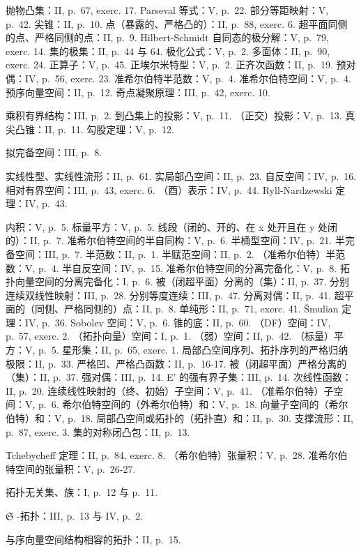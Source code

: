 抛物凸集：II, p.~67, exerc. 17. Parseval 等式：V, p.~22. 部分等距映射：V, p.~42. 尖锥：II, p.~10. 点（暴露的、严格凸的）：II, p.~88, exerc. 6. 超平面同侧的点、严格同侧的点：II, p.~9. Hilbert-Schmidt 自同态的极分解：V, p.~79, exerc. 14. 集的极集：II, p.~44 与 64. 极化公式：V, p.~2. 多面体：II, p.~90, exerc. 24. 正算子：V, p.~45. 正埃尔米特型：V, p.~2. 正齐次函数：II, p.~19. 预对偶：IV, p.~56, exerc. 23. 准希尔伯特半范数：V, p.~4. 准希尔伯特空间：V, p.~4. 预序向量空间：II, p.~12. 奇点凝聚原理：III, p.~42, exerc. 10.

乘积有界结构：III, p.~2. 到凸集上的投影：V, p.~11. （正交）投影：V, p.~13. 真尖凸锥：II, p.~11. 勾股定理：V, p.~12.

拟完备空间：III, p.~8.

实线性型、实线性流形：II, p.~61. 实局部凸空间：II, p.~23. 自反空间：IV, p.~16. 相对有界空间：III, p.~43, exerc. 6. （酉）表示：IV, p.~44. Ryll-Nardzewski 定理：IV, p.~43.

内积：V, p.~5. 标量平方：V, p.~5. 线段（闭的、开的、在 x 处开且在 y 处闭的）：II, p.~7. 准希尔伯特空间的半自同构：V, p.~6. 半桶型空间：IV, p.~21. 半完备空间：III, p.~7. 半范数：II, p.~1. 半赋范空间：II, p.~2. （准希尔伯特）半范数：V, p.~4. 半自反空间：IV, p.~15. 准希尔伯特空间的分离完备化：V, p.~8. 拓扑向量空间的分离完备化：I, p.~6. 被（闭超平面）分离的（集）：II, p.~37. 分别连续双线性映射：III, p.~28. 分别等度连续：III, p.~47. 分离对偶：II, p.~41. 超平面的（同侧、严格同侧的）点：II, p.~8. 单纯形：II, p.~71, exerc. 41. Šmulian 定理：IV, p.~36. Sobolev 空间：V, p.~6. 锥的底：II, p.~60. （DF）空间：IV, p.~57, exerc. 2. （拓扑向量）空间：I, p.~1. （弱）空间：II, p.~42. （标量）平方：V, p.~5. 星形集：II, p.~65, exerc. 1. 局部凸空间序列、拓扑序列的严格归纳极限：II, p.~33. 严格凹、严格凸函数：II, p.~16-17. 被（闭超平面）严格分离的（集）：II, p.~37. 强对偶：III, p.~14. E' 的强有界子集：III, p.~14. 次线性函数：II, p.~20. 连续线性映射的（终、初始）子空间：V, p.~41. （准希尔伯特）子空间：V, p.~6. 希尔伯特空间的（外希尔伯特）和：V, p.~18. 向量子空间的（希尔伯特）和：V, p.~18. 局部凸空间或拓扑的（拓扑直）和：II, p.~30. 支撑流形：II, p.~87, exerc. 3. 集的对称闭凸包：II, p.~13.

Tchebycheff 定理：II, p.~84, exerc. 8. （希尔伯特）张量积：V, p.~28. 准希尔伯特空间的张量积：V, p.~26-27.

拓扑无关集、族：I, p.~12 与 p.~11.

\(\mathfrak{S}\) -拓扑：III, p.~13 与 IV, p.~2.

与序向量空间结构相容的拓扑：II, p.~15.

